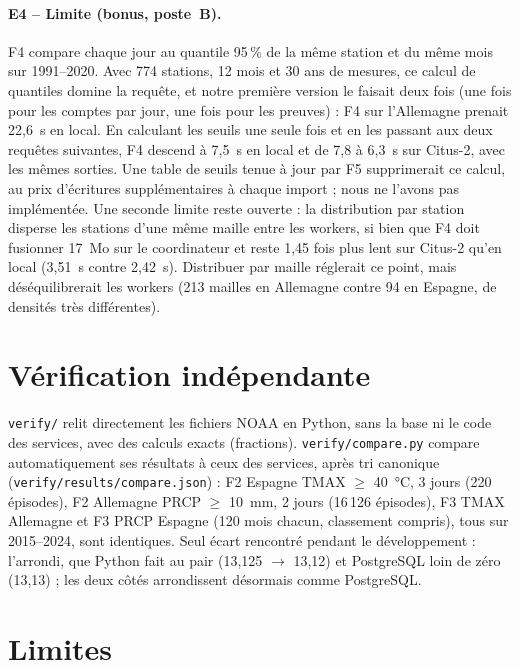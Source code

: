 \documentclass{rapportClass}
\newcommand{\cmd}[1]{\texttt{#1}}
\begin{document}
\paragraph{E4 -- Limite (bonus, poste~B).} F4 compare chaque jour au quantile 95\,\% de la même station et du même
mois sur 1991--2020. Avec 774 stations, 12 mois et 30 ans de mesures, ce calcul de quantiles domine la requête,
et notre première version le faisait deux fois (une fois pour les comptes par jour, une fois pour les preuves) :
F4 sur l'Allemagne prenait 22,6~s en local. En calculant les seuils une seule fois et en les passant aux deux
requêtes suivantes, F4 descend à 7,5~s en local et de 7,8 à 6,3~s sur Citus-2, avec les mêmes sorties. Une table
de seuils tenue à jour par F5 supprimerait ce calcul, au prix d'écritures supplémentaires à chaque import ; nous
ne l'avons pas implémentée. Une seconde limite reste ouverte : la distribution par station disperse les stations
d'une même maille entre les workers, si bien que F4 doit fusionner 17~Mo sur le coordinateur et reste 1,45 fois
plus lent sur Citus-2 qu'en local (3,51~s contre 2,42~s). Distribuer par maille réglerait ce point, mais
déséquilibrerait les workers (213 mailles en Allemagne contre 94 en Espagne, de densités très différentes).

\section{Vérification indépendante}

\cmd{verify/} relit directement les fichiers NOAA en Python, sans la base ni le code des services,
avec des calculs exacts (fractions). \cmd{verify/compare.py} compare automatiquement ses résultats à ceux des
services, après tri canonique (\cmd{verify/results/compare.json}) : F2 Espagne TMAX $\ge$ 40~°C, 3 jours
(220 épisodes), F2 Allemagne PRCP $\ge$ 10~mm, 2 jours (16\,126 épisodes), F3 TMAX Allemagne et F3 PRCP Espagne
(120 mois chacun, classement compris), tous sur 2015--2024, sont identiques.
Seul écart rencontré pendant le développement : l'arrondi, que Python fait au pair (13,125 $\to$ 13,12) et PostgreSQL
loin de zéro (13,13) ; les deux côtés arrondissent désormais comme PostgreSQL.

\section{Limites}
\end{document}
